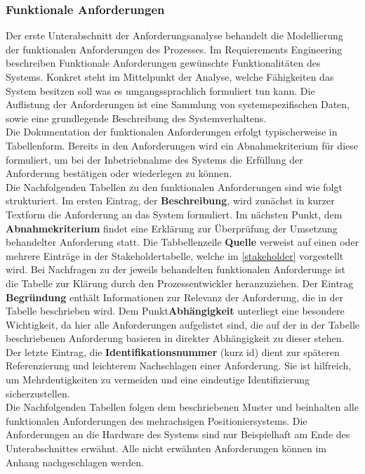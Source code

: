 \documentclass[../../../Bachelorarbeit.tex]{subfiles}
\begin{document}
\subsubsection{Funktionale Anforderungen}
Der erste Unterabschnitt der Anforderungsanalyse behandelt die Modellierung der funktionalen Anforderungen des Prozesses. Im Requierements Engineering beschreiben Funktionale Anforderungen gewünschte Funktionalitäten des Systems. Konkret steht im Mittelpunkt der Analyse, welche Fähigkeiten das System besitzen soll \bzw was es umgangssprachlich formuliert tun kann. Die Auflistung der Anforderungen ist eine Sammlung von systemspezifischen Daten, sowie eine grundlegende Beschreibung des Systemverhaltens. \\ %
Die Dokumentation der funktionalen Anforderungen erfolgt typischerweise in Tabellenform. Bereits in den Anforderungen wird ein Abnahmekriterium für diese formuliert, um bei der Inbetriebnahme des Systems die Erfüllung der Anforderung bestätigen oder wiederlegen zu können.\\ %
Die Nachfolgenden Tabellen zu den funktionalen Anforderungen sind wie folgt strukturiert. Im ersten Eintrag, der \textbf{Beschreibung}, wird zunächst in kurzer Textform die Anforderung an das System formuliert. Im nächsten Punkt, dem \textbf{Abnahmekriterium} findet eine Erklärung zur Überprüfung der Umsetzung behandelter Anforderung statt. Die Tabbellenzeile \textbf{Quelle} verweist auf einen oder mehrere Einträge in der Stakeholdertabelle, welche im \autoref{stakeholder} vorgestellt wird. Bei Nachfragen zu der jeweils behandelten funktionalen Anforderunge ist die Tabelle zur Klärung durch den Prozessentwickler heranzuziehen. Der Eintrag \textbf{Begründung} enthält Informationen zur Relevanz der Anforderung, die in der Tabelle beschrieben wird. Dem Punkt\textbf{Abhängigkeit} unterliegt eine besondere Wichtigkeit, da hier alle Anforderungen aufgelistet sind, die auf der in der Tabelle beschriebenen Anforderung basieren \bzw in direkter Abhängigkeit zu dieser stehen. Der letzte Eintrag, die \textbf{Identifikationsnummer} (kurz \acs{id}) dient zur späteren Referenzierung und leichterem Nachschlagen einer Anforderung. Sie ist hilfreich, um Mehrdeutigkeiten zu vermeiden und eine eindeutige Identifizierung sicherzustellen.\\ %
Die Nachfolgenden Tabellen folgen dem beschriebenen Muster und beinhalten alle funktionalen Anforderungen des mehrachsigen Positioniersystems. Die Anforderungen an die Hardware des Systems sind nur Beispielhaft am Ende des Unterabschnittes erwähnt. Alle nicht erwähnten Anforderungen können im Anhang nachgeschlagen werden.
\end{document}

